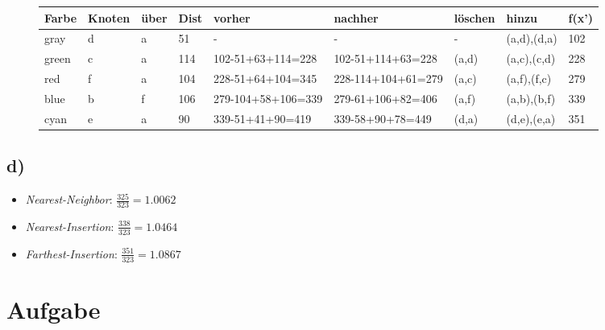 \documentclass[12pt]{article}
\begin{document}
	\begin{figure}[H]
		\centering
		\begin{tabular}{l | l | l|l|l|l|l|l|l}
			Farbe & Knoten & über & Dist & vorher & nachher &löschen & hinzu & f(x') \\ \hline
			\color{gray}gray & d & a & 51 & - & - & - & (a,d),(d,a) & 102 \\
			\color{green}green & c & a & 114 & 102-51+63+114=228 & 102-51+114+63=228 & (a,d) & (a,c),(c,d) & 228\\
			\color{red}red & f & a & 104 & 228-51+64+104=345 & 228-114+104+61=279 & (a,c) & (a,f),(f,c) & 279\\
			\color{blue}blue & b & f & 106 & 279-104+58+106=339 & 279-61+106+82=406 & (a,f) & (a,b),(b,f) & 339\\
			\color{cyan}cyan & e & a & 90 & 339-51+41+90=419 & 339-58+90+78=449 & (d,a) & (d,e),(e,a) & 351\\
		\end{tabular}
	\end{figure}

	\subsection{d)}
		\begin{itemize}
			\item \textit{Nearest-Neighbor}: $\frac{325}{323}=1.0062$
			\item \textit{Nearest-Insertion}: $\frac{338}{323}=1.0464$
			\item \textit{Farthest-Insertion}: $\frac{351}{323}=1.0867$
		\end{itemize}
		
	\section{Aufgabe}
		
		
\end{document}
